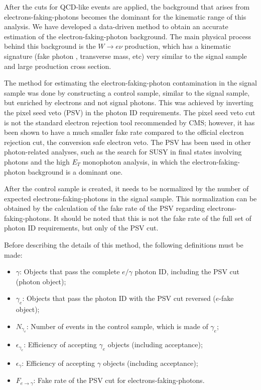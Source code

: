 
After the cuts for QCD-like events are applied, the background that arises from electrons-faking-photons becomes the dominant for the kinematic range of this analysis. We have developed a data-driven method to obtain an accurate estimation of the electron-faking-photon background.
The main physical process behind this background is the $W\rightarrow e \nu$ production, which has a kinematic signature (fake photon \et, transverse mass, etc) very similar to the signal sample and large production cross section.

The method for estimating the electron-faking-photon contamination in the signal sample was done by constructing a control sample, similar to the signal sample, but enriched by electrons and not signal photons. This was achieved by inverting the pixel seed veto (PSV) in the photon ID requirements. The pixel seed veto cut is not the standard electron rejection tool recommended by CMS; however, it has been shown to have a much smaller fake rate compared to the official electron rejection cut, the conversion safe electron veto. The PSV has been used in other photon-related analyses, such as the search for SUSY in final states involving photons and the high $E_{T}$ monophoton analysis, in which the electron-faking-photon background is a dominant one.

After the control sample is created, it needs to be normalized by the number of expected electrons-faking-photons in the signal sample. This normalization can be obtained by the calculation of the fake rate of the PSV regarding electrons-faking-photons. It should be noted that this is not the fake rate of the full set of photon ID requirements, but only of the PSV cut. 

Before describing the details of this method, the following definitions must be made:

\begin{itemize}
\item $\gamma$: Objects that pass the complete $e/\gamma$ photon ID, including the PSV cut (photon object);
\item $\gamma_e$: Objects that pass the photon ID with the PSV cut reversed ($e$-fake object);
\item $N_{\gamma_e}$: Number of events in the control sample, which is made of $\gamma_e$;
\item $\epsilon_{\gamma_e}$: Efficiency of accepting $\gamma_e$ objects (including acceptance);
\item $\epsilon_{\gamma}$: Efficiency of accepting $\gamma$ objects (including acceptance);
\item $F_{e\rightarrow\gamma}$: Fake rate of the PSV cut for electrons-faking-photons.
\end{itemize}

